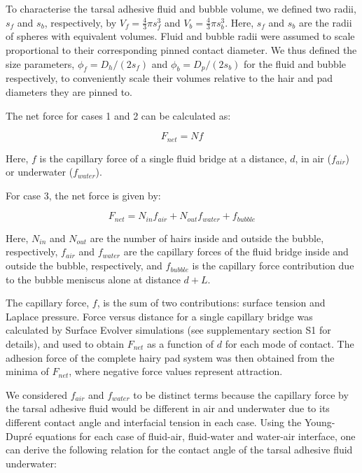 \documentclass[vruler,JEB]{COB}%
\begin{document}
To characterise the tarsal adhesive fluid and bubble volume, we defined two
radii, $s_{f}$ and $s_{b}$, respectively, by $V_{f}=\frac{4}{3}\pi s_{f}^{3}$
and $V_{b}=\frac{4}{3}\pi s_{b}^{3}$. Here, $s_{f}$ and $s_{b}$
are the radii of spheres with equivalent volumes. Fluid and bubble
radii were assumed to scale proportional to their corresponding pinned
contact diameter. We thus defined the size parameters, $\phi_{f}=D_{h}/(2s_{f})$
and $\phi_{b}=D_{p}/(2s_{b})$ for the fluid and bubble
respectively, to conveniently scale their volumes relative to the
hair and pad diameters they are pinned to.

The net force for cases 1 and 2 can be calculated as:

\begin{equation}
F_{net}=Nf\label{eq:f_air/water}
\end{equation}

Here, $f$ is the capillary force of a single fluid bridge at a distance,
$d$, in air ($f_{air}$) or underwater ($f_{water}$).

For case 3, the net force is given by:

\begin{equation}
F_{net}=N_{in}f_{air}+N_{out}f_{water}+f_{bubble}\label{eq:f_bubble}
\end{equation}

Here, $N_{in}$ and $N_{out}$ are the number of hairs inside and
outside the bubble, respectively, $f_{air}$ and $f_{water}$ are
the capillary forces of the fluid bridge inside and outside the bubble,
respectively, and $f_{bubble}$ is the capillary force contribution
due to the bubble meniscus alone at distance $d+L$. 

The capillary force, $f$, is the sum of two contributions: surface
tension and Laplace pressure. Force
versus distance for a single capillary bridge was calculated by Surface
Evolver simulations\citep{RN206}  (see supplementary section S1 for details),
and used to obtain $F_{net}$ as a function of $d$ for each mode
of contact. The adhesion force of the complete hairy pad system was
then obtained from the minima of $F_{net}$, where negative force
values represent attraction.

We considered $f_{air}$ and $f_{water}$ to be distinct terms
because the capillary force by the tarsal adhesive fluid would be different
in air and underwater due to its different contact angle and interfacial
tension in each case. Using the Young-Dupr\'{e} equations
for each case of fluid-air, fluid-water and water-air interface, one
can derive the following relation for the contact angle of the tarsal adhesive
fluid underwater:
\end{document}
